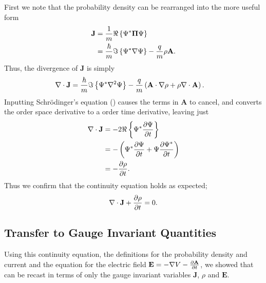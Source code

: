 First we note that the probability density can be rearranged into the more
useful form
\begin{align}
    \mathbf{J} &= \frac{1}{m} \Re \left\{ \Psi^* \mathbf{\Pi} \Psi \right\} \\
               &= \frac{\hbar}{m} \Im \left\{ \Psi^* \nabla \Psi \right\} - \frac{q}{m} \rho
                    \mathbf{A}.
\end{align}
Thus, the divergence of $\mathbf{J}$ is simply
\begin{align}
    \nabla \cdot \mathbf{ J } &= \frac{\hbar}{m} \Im \left\{ \Psi^* \nabla^2 \Psi \right\} - \frac{q}{m} \left(
                \mathbf{A} \cdot \nabla \rho + \rho \nabla \cdot
                \mathbf{A} \right).
\end{align}
Inputting Schr\"odinger's equation () causes the terms in
$\mathbf{A}$ to cancel, and converts the  order space
derivative to a  order time derivative, leaving just
\begin{align}
    \nabla \cdot \mathbf{ J } &= -2 \Re \left\{ \Psi^* \frac{\partial \Psi}{\partial t} \right\} \\
            &= - \left( \Psi^* \frac{\partial \Psi}{\partial t}
               + \Psi \frac{\partial \Psi^*}{\partial t} \right) \\
            &= - \frac{\partial \rho}{\partial t}.
\end{align}
Thus we confirm that the continuity equation holds as expected;
\begin{align}
    \nabla \cdot \mathbf{ J } + \frac{\partial \rho}{\partial t} = 0.
    \label{eqn:continuity}
\end{align}

\subsection{Transfer to Gauge Invariant Quantities}

Using this continuity equation, the definitions for the probability density and
current and the equation for the electric field $\mathbf{E} = - \nabla V -
\frac{\partial \mathbf{A}}{\partial t}$, we showed that  can be recast
in terms of only the gauge invariant variables $\mathbf{J}$, $\rho$ and
$\mathbf{E}$.

